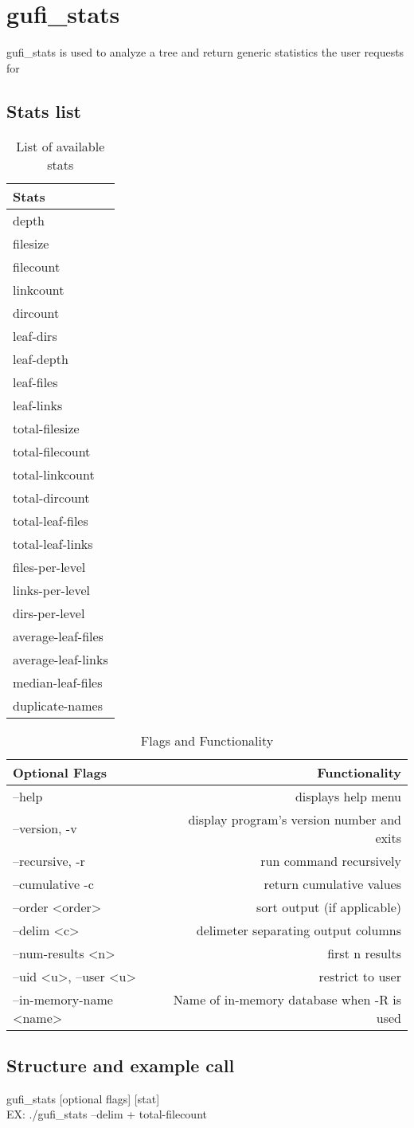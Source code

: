 \section{gufi\_stats}
gufi\_stats is used to analyze a tree and return generic statistics the user requests for

\subsection{Stats list}
\begin{table} [h]
\centering
\begin{tabular}{l}
Stats\\\hline
depth \\
filesize \\
filecount \\
linkcount \\
dircount \\
leaf-dirs \\
leaf-depth \\
leaf-files \\
leaf-links \\
total-filesize \\
total-filecount \\
total-linkcount \\
total-dircount \\
total-leaf-files \\
total-leaf-links \\
files-per-level \\ 
links-per-level \\
dirs-per-level \\
average-leaf-files \\
average-leaf-links \\ 
median-leaf-files \\
duplicate-names
\end{tabular}
\caption{\label{tab:widgets}List of available stats}
\end{table}

\begin{table} [h]
\centering
\begin{tabular}{l|r}
Optional Flags & Functionality\\\hline
--help & displays help menu\\ 
--version, -v & display program's version number and exits \\
--recursive, -r & run command recursively \\
--cumulative -c & return cumulative values \\
--order \textless order\textgreater & sort output (if applicable)\\
--delim \textless c\textgreater & delimeter separating output columns\\
--num-results \textless n\textgreater & first n results \\
--uid \textless u\textgreater, --user \textless u\textgreater & restrict to user \\
--in-memory-name \textless name\textgreater & Name of in-memory database when -R is used
\end{tabular}
\caption{\label{tab:widgets}Flags and Functionality}
\end{table}

\subsection{Structure and example call}
gufi\_stats [optional flags] [stat] \\
EX: ./gufi\_stats --delim + total-filecount